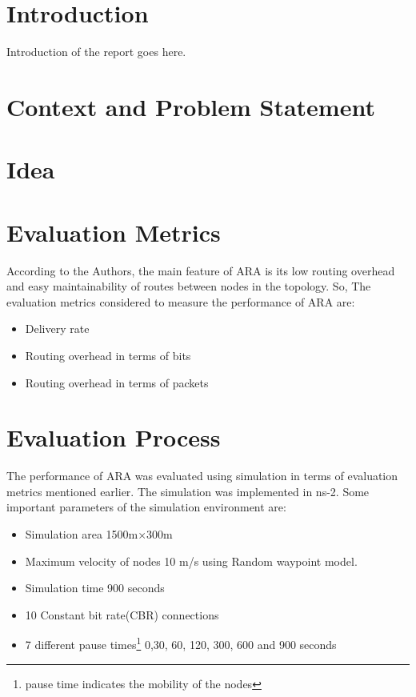 \section{Introduction}
Introduction of the report goes here. 


\section{Context and Problem Statement}


\section{Idea}

\section{Evaluation Metrics}
According to the Authors, the main feature of ARA is its low routing overhead and easy maintainability of routes between nodes in the topology. So, The evaluation metrics considered to measure the performance of ARA are:
\begin{itemize}
\item Delivery rate 
\item Routing overhead in terms of bits
\item Routing overhead in terms of packets
\end{itemize}

\section{Evaluation Process}
The performance of ARA was evaluated using simulation in terms of evaluation metrics mentioned earlier. 
The simulation was implemented in ns-2. Some important parameters of the simulation environment are:

\begin{itemize}
\item Simulation area  1500m×300m 
\item Maximum velocity of nodes 10 m/s using Random waypoint model.
\item Simulation time  900 seconds
\item 10 Constant bit rate(CBR) connections
\item 7 different pause times\footnote{pause time indicates the mobility of the nodes} 0,30, 60, 120, 300, 600 and 900 seconds
\end{itemize}


